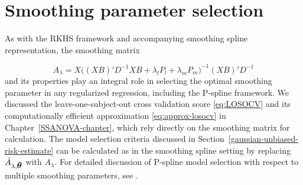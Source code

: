

\section{Smoothing parameter selection}

%
As with the RKHS framework and accompanying smoothing spline representation, the smoothing matrix  

\begin{equation*}\label{eq:pspline-smoothing-matrix}
A_\lambda = X \big( \left(X B\right)' D^{-1} XB +  \lambda_l P_l+ \lambda_m P_m \big)^{-1}\left(X B\right)' D^{-1}
\end{equation*}
\noindent
and its properties play an integral role in selecting the optimal smoothing parameter in any regularized regression, including the P-spline framework. We discussed the leave-one-subject-out cross validation score \eqref{eq:LOSOCV} and its computationally efficient approximation \eqref{eq:approx-losocv} in Chapter~\ref{SSANOVA-chapter}, which rely directly on the smoothing matrix for calculation. The model selection criteria discussed in Section~\ref{gaussian-unbiased-risk-estimate}  can be calculated as in the smoothing spline setting by replacing $\tilde{A}_{\lambda,\mbox{\boldmath $\theta$}}$ with $A_\lambda$. For detailed discussion of P-spline model selection with respect to multiple smoothing parameters, see \cite{wood2017generalized}.

\bigskip

